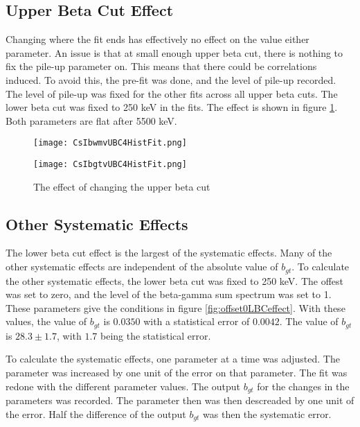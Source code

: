 \documentclass[main.tex]{subfiles}
\begin{document}
\subsection{Upper Beta Cut Effect}

Changing where the fit ends has effectively no effect on the value either parameter.
An issue is that at small enough upper beta cut, there is nothing to fix the pile-up parameter on. 
This means that there could be correlations induced.
To avoid this, the  pre-fit was done, and the level of pile-up recorded.
The level of pile-up was fixed for the other fits across all upper beta cuts.
The lower beta cut was fixed to 250 keV in the fits. 
The effect is shown in figure \ref{fig:UBCEffect}.
Both parameters are flat after 5500 keV.

\begin{figure}
    \centering
    \begin{minipage}{0.50\textwidth}
        \centerline{\texttt{[image: CsIbwmvUBC4HistFit.png]}}
    \end{minipage}\hfill
    \begin{minipage}{0.50\textwidth}
        \centerline{\texttt{[image: CsIbgtvUBC4HistFit.png]}}
    \end{minipage}
    \caption{The effect of changing the upper beta cut}
    \label{fig:UBCEffect}
\end{figure}


\subsection{Other Systematic Effects}

The lower beta cut effect is the largest of the systematic effects.
Many of the other systematic effects are independent of the absolute value of $b_{gt}$.
To calculate the other systematic effects, the lower beta cut was fixed to 250 keV.
The offest was set to zero, and the level of the beta-gamma sum spectrum was set to 1.
These parameters give the conditions in figure \ref{fig:offset0LBCeffect}.
With these values, the value of $b_{gt}$ is $0.0350$ with a statistical error of $0.0042$.
The value of $b_{gt}$ is $28.3 \pm 1.7$, with $1.7$ being the statistical error.

To calculate the systematic effects, one parameter at a time was adjusted.
The parameter was increased by one unit of the error on that parameter.
The fit was redone with the different parameter values.
The output $b_{gt}$ for the changes in the parameters was recorded.
The parameter then was then descreaded by one unit of the error.
Half the difference of the output $b_{gt}$ was then the systematic error.
\end{document}
